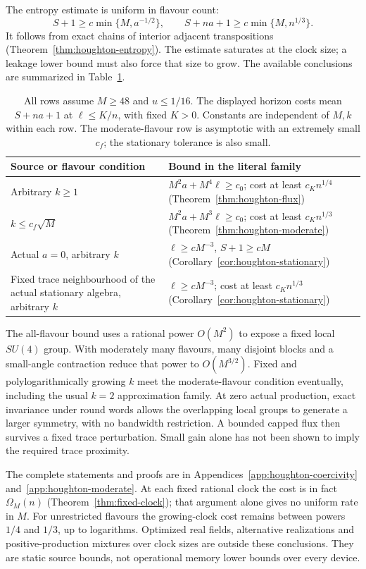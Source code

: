 The entropy estimate is uniform in flavour count:
\[
 S+1\geq c\min\{M,a^{-1/2}\},\qquad
 S+na+1\geq c\min\{M,n^{1/3}\}.
\]
It follows from exact chains of interior adjacent transpositions
(Theorem~\ref{thm:houghton-entropy}). The estimate saturates at the
clock size; a leakage lower bound must also force that size to grow.
The available conclusions are summarized in Table~\ref{tab:houghton-scope}.

\begin{table}[ht]
\centering\small
\begin{tabularx}{\textwidth}{@{}>{\raggedright\arraybackslash}X>{\raggedright\arraybackslash}X@{}}
\toprule
Source or flavour condition & Bound in the literal family\\
\midrule
Arbitrary $k\geq1$ & $M^2a+M^4\ell\geq c_0$;
cost at least $c_Kn^{1/4}$ (Theorem~\ref{thm:houghton-flux})\\
$k\leq c_f\sqrt M$ & $M^2a+M^3\ell\geq c_0$;
cost at least $c_Kn^{1/3}$ (Theorem~\ref{thm:houghton-moderate})\\
Actual $a=0$, arbitrary $k$ & $\ell\geq cM^{-3}$,
$S+1\geq cM$ (Corollary~\ref{cor:houghton-stationary})\\
Fixed trace neighbourhood of the actual stationary algebra,
arbitrary $k$ & $\ell\geq cM^{-3}$;
cost at least $c_Kn^{1/3}$ (Corollary~\ref{cor:houghton-stationary})\\
\bottomrule
\end{tabularx}
\caption{All rows assume $M\geq48$ and $u\leq1/16$.
The displayed horizon costs mean $S+na+1$ at $\ell\leq K/n$,
with fixed $K>0$. Constants are independent of $M,k$ within each row.
The moderate-flavour row is asymptotic with an extremely small $c_f$;
the stationary tolerance is also small.}
\label{tab:houghton-scope}
\end{table}

The all-flavour bound uses a rational power $O(M^2)$ to expose a
fixed local $SU(4)$ group. With moderately many flavours, many
disjoint blocks and a small-angle contraction reduce that power to
$O(M^{3/2})$. Fixed and polylogarithmically growing $k$ meet the
moderate-flavour condition eventually, including the usual $k=2$
approximation family. At zero actual production, exact invariance
under round words allows the overlapping local groups to generate
a larger symmetry, with no bandwidth restriction. A bounded capped
flux then survives a fixed trace perturbation. Small gain alone has
not been shown to imply the required trace proximity.

The complete statements and proofs are in
Appendices~\ref{app:houghton-coercivity} and~\ref{app:houghton-moderate}.
At each fixed rational clock the cost is in fact $\Omega_M(n)$
(Theorem~\ref{thm:fixed-clock}); that argument alone gives no uniform
rate in $M$. For unrestricted flavours the growing-clock cost remains
between powers $1/4$ and $1/3$, up to logarithms. Optimized real fields,
alternative realizations and positive-production mixtures over clock
sizes are outside these conclusions. They are static source bounds,
not operational memory lower bounds over every device.
